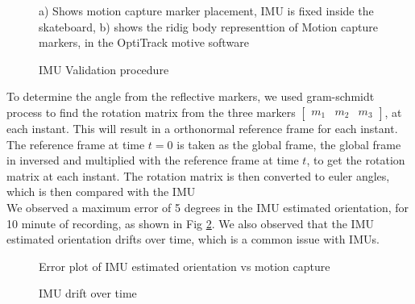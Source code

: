 \documentclass[12pt, twoside]{report}
\begin{document}
\begin{figure}[h!]
    \centering
    \caption{IMU Validation procedure}
    {a) Shows motion capture marker placement, IMU is fixed inside the skateboard, b) shows the ridig body representtion of Motion capture markers, in the OptiTrack
        motive software}
    \label{fig:imu_skematic}
\end{figure}

To determine the angle from the reflective markers, we used gram-schmidt process to find the rotation matrix
from the three markers $\begin{bmatrix}
        m_1 & m_2 & m_3
    \end{bmatrix}$, at each instant. This will result in a orthonormal reference frame for each instant. \\

The reference frame at time $t = 0$ is taken as the global frame, the global frame in inversed and multiplied with
the reference frame at time $t$, to get the rotation matrix at each instant.
The rotation matrix is then converted to euler angles, which is then compared with the IMU\\

We observed a maximum error of 5 degrees in the IMU estimated orientation, for 10 minute of recording, as shown
in Fig \ref{fig:imu_val}. We also observed that the IMU estimated orientation drifts over time,
which is a common issue with IMUs.


\begin{figure}[hbt!]
    \centering
    \caption{IMU drift over time}
    {Error plot of IMU estimated orientation vs motion capture}
    \label{fig:imu_val}
\end{figure}
\end{document}
